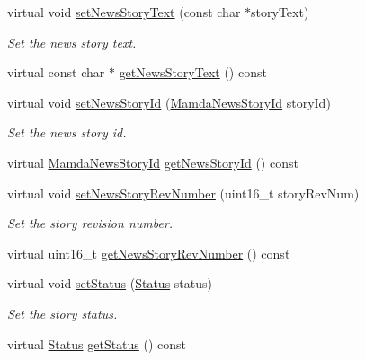 \begin{CompactItemize}
virtual void \hyperlink{classWombat_1_1MamdaNewsStory_f1488165cc643bbb22f25c4cb663b4fc}{set\-News\-Story\-Text} (const char $\ast$story\-Text)
\begin{CompactList}\small\item\em Set the news story text. \item\end{CompactList}\item 
virtual const char $\ast$ \hyperlink{classWombat_1_1MamdaNewsStory_e68839ca0ed6aff2d7385400a59444c1}{get\-News\-Story\-Text} () const 
\item 
virtual void \hyperlink{classWombat_1_1MamdaNewsStory_6cae68131977f93f240a4fcb336063b4}{set\-News\-Story\-Id} (\hyperlink{namespaceWombat_f7b94f4bb44eb78420c0d3ba0413424e}{Mamda\-News\-Story\-Id} story\-Id)
\begin{CompactList}\small\item\em Set the news story id. \item\end{CompactList}\item 
virtual \hyperlink{namespaceWombat_f7b94f4bb44eb78420c0d3ba0413424e}{Mamda\-News\-Story\-Id} \hyperlink{classWombat_1_1MamdaNewsStory_e997764d03f29d1465a395497d68811b}{get\-News\-Story\-Id} () const 
\item 
virtual void \hyperlink{classWombat_1_1MamdaNewsStory_2e6e16aff657f33fbbb789a72eaa553e}{set\-News\-Story\-Rev\-Number} (uint16\_\-t story\-Rev\-Num)
\begin{CompactList}\small\item\em Set the story revision number. \item\end{CompactList}\item 
virtual uint16\_\-t \hyperlink{classWombat_1_1MamdaNewsStory_8d9ab8e6dad0a9d90d2ea6bb719ab28c}{get\-News\-Story\-Rev\-Number} () const 
\item 
virtual void \hyperlink{classWombat_1_1MamdaNewsStory_7c13140bbd6ccacd7ef94dcd657ca07b}{set\-Status} (\hyperlink{classWombat_1_1MamdaNewsStory_25ee81ce6b01be03a95ab954acdb1e6d}{Status} status)
\begin{CompactList}\small\item\em Set the story status. \item\end{CompactList}\item 
virtual \hyperlink{classWombat_1_1MamdaNewsStory_25ee81ce6b01be03a95ab954acdb1e6d}{Status} \hyperlink{classWombat_1_1MamdaNewsStory_e8ae79512f3fbf9328f5a8a71db10aba}{get\-Status} () const 

\end{CompactItemize}
